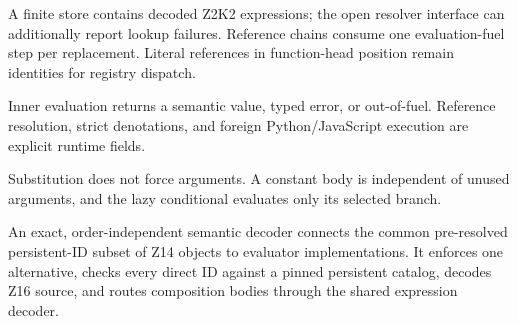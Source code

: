 \begin{definition}\label{def:references}
  \leanok
  A finite store contains decoded Z2K2 expressions; the open resolver interface can additionally
  report lookup failures.  Reference chains consume one evaluation-fuel step per replacement.
  Literal references in function-head position remain identities for registry dispatch.
\end{definition}

\begin{definition}\label{def:eval}
  \leanok
  Inner evaluation returns a semantic value, typed error, or out-of-fuel.  Reference resolution,
  strict denotations, and foreign Python/JavaScript execution are explicit runtime fields.
\end{definition}

\begin{lemma}\label{lem:laziness}
  \leanok
  Substitution does not force arguments.  A constant body is independent of unused arguments, and
  the lazy conditional evaluates only its selected branch.
\end{lemma}

\begin{definition}\label{def:elaboration}
  \leanok
  An exact, order-independent semantic decoder connects the common pre-resolved persistent-ID
  subset of Z14 objects to evaluator implementations.  It enforces one alternative, checks every
  direct ID against a pinned persistent catalog, decodes Z16 source, and routes composition bodies
  through the shared expression decoder.
\end{definition}

